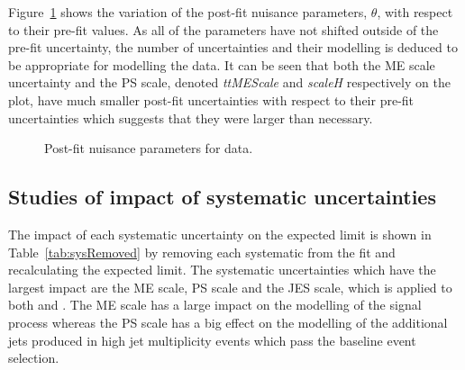 Figure~\ref{fig:datanuis} shows the variation of the post-fit nuisance parameters, $\theta$, with respect to their pre-fit values. As all of the parameters have not shifted outside of the pre-fit uncertainty, the number of uncertainties and their modelling is deduced to be appropriate for modelling the data. It can be seen that both the \ttbar ME scale uncertainty and the PS scale, denoted \emph{ttMEScale} and \emph{scaleH} respectively on the plot, have much smaller post-fit uncertainties with respect to their pre-fit uncertainties which suggests that they were larger than necessary.

\begin{figure}[h!]
\begin{center}
\hspace{0.2cm}
\end{center}
\caption{Post-fit nuisance parameters for data.}
\label{fig:datanuis}
\end{figure} 

\subsection{Studies of impact of systematic uncertainties}

The impact of each systematic uncertainty on the expected limit is shown in Table~\ref{tab:sysRemoved} by removing each systematic from the fit and recalculating the expected limit. The systematic uncertainties which have the largest impact are the \ttbar ME scale, \ttbar PS scale and the JES scale, which is applied to both \ttbar and \tttt. The \ttbar ME scale has a large impact on the modelling of the signal process whereas the \ttbar PS scale has a big effect on the modelling of the additional jets produced in high jet multiplicity \ttbar events which pass the baseline event selection.

